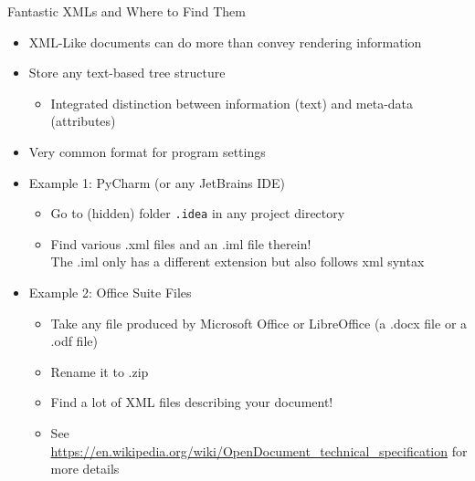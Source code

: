 \begin{frame}{Fantastic XMLs and Where to Find Them}
%
\begin{itemize}
\item XML-Like documents can do more than convey rendering information
\item Store any text-based tree structure
	\begin{itemize}
	\item Integrated distinction between information (text) and meta-data (attributes)
	\end{itemize}
\item[\Thus] Very common format for program settings
\pause
\item Example 1: PyCharm (or any JetBrains IDE)
	\begin{itemize}
	\item Go to (hidden) folder \texttt{.idea} in any project directory
	\item Find various .xml files and an .iml file therein!\\
	 	The .iml only has a different extension but also follows xml syntax
	\end{itemize}
\pause
\item Example 2: Office Suite Files
	\begin{itemize}
	\item Take any file produced by Microsoft Office or LibreOffice (\zB a .docx file or a .odf file)
	\item Rename it to .zip
	\item Find a lot of XML files describing your document!
	\item See \url{https://en.wikipedia.org/wiki/OpenDocument_technical_specification} for more details
	\end{itemize}
\end{itemize}
%
\end{frame}


